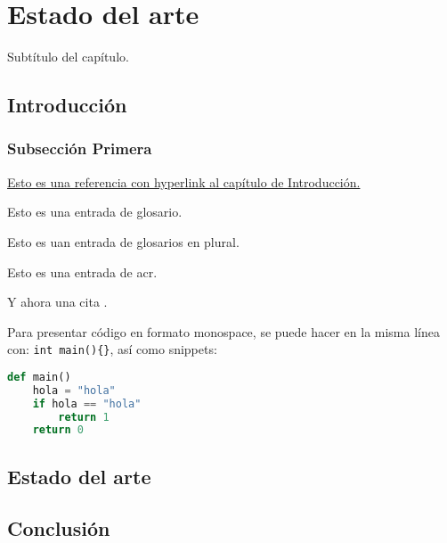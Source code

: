 \chapter{Estado del arte}
    Subtítulo del capítulo.
    \section{Introducción}
        \lipsum[9]
        \subsection{Subsección Primera}
            \hyperlink{section.1.1}{Esto es una referencia con hyperlink al capítulo de Introducción.}
            
            Esto es una entrada de \gls{glosario}.

            Esto es uan entrada de \glspl{glosario} en plural.
            
            Esto es una entrada de \gls{acr}.

            Y ahora una cita \cite{REF1}.

            Para presentar código en formato monospace, se puede hacer en la misma línea con:
            \lstinline|int main(){}|, así como snippets:
            \begin{lstlisting}[language=Python]
def main()
    hola = "hola"
    if hola == "hola"
        return 1
    return 0            \end{lstlisting}

            \lipsum[15-20]

    \section{Estado del arte}
        \lipsum[9-12]

    \section{Conclusión}
        \lipsum[9-12]
